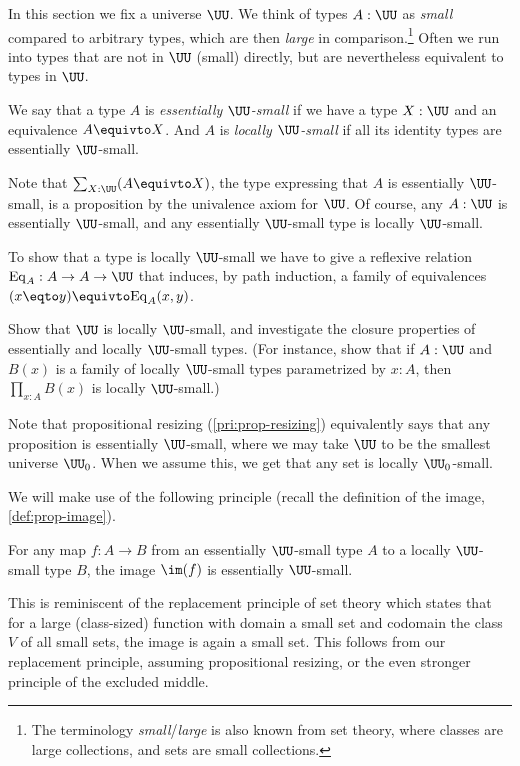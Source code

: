 In this section we fix a universe $\UU$.
We think of types $A:\UU$ as \emph{small} compared to arbitrary types,
which are then \emph{large} in comparison.\footnote{%
  The terminology \emph{small}/\emph{large} is also known from set theory,
  where classes are large collections,
  and sets are small collections.}
Often we run into types that are not in $\UU$ (small) directly,
but are nevertheless equivalent to types in $\UU$.
\begin{definition}\label{def:ess-loc-small}
  We say that a type $A$ is \emph{essentially $\UU$-small} if we
  have a type $X:\UU$ and an equivalence $A \equivto
  X$. And $A$ is \emph{locally $\UU$-small} if all its identity types
  are essentially $\UU$-small.
\end{definition}
Note that $\sum_{X:\UU}(A \equivto X)$, the type expressing that
$A$ is essentially $\UU$-small, is a proposition by the
univalence axiom for $\UU$.
Of course, any $A:\UU$ is essentially $\UU$-small,
and any essentially $\UU$-small type is locally $\UU$-small.

To show that a type is locally $\UU$-small
we have to give a reflexive relation
$\mathrm{Eq}_A : A \to A \to \UU$
that induces, by path induction, a family of equivalences
$(x \eqto y) \equivto \mathrm{Eq}_A(x,y)$.

\begin{xca}
  Show that $\UU$ is locally $\UU$-small, and investigate
  the closure properties of essentially and locally $\UU$-small types.
  (For instance, show that if $A:\UU$ and $B(x)$ is a family of locally $\UU$-small
  types parametrized by $x:A$, then $\prod_{x:A}B(x)$ is locally $\UU$-small.)
\end{xca}

\begin{remark}
  Note that propositional resizing (\cref{pri:prop-resizing})
  equivalently says that any proposition is essentially $\UU$-small,
  where we may take $\UU$ to be the smallest universe $\UU_0$.
  When we assume this, we get that any set is locally $\UU_0$-small.
\end{remark}

We will make use of the following principle
(recall the definition of the image, \cref{def:prop-image}).
\begin{principle}[Replacement]
  \label{pri:replacement}
  For any map $f : A \to B$
  from an essentially $\UU$-small type $A$
  to a locally $\UU$-small type $B$,
  the image $\im(f)$ is essentially $\UU$-small.
\end{principle}
This is reminiscent of the replacement principle of set theory which states
that for a large (class-sized) function with domain a small set
and codomain the class $V$ of all small sets,
the image is again a small set.
This follows from our replacement principle,
assuming propositional resizing,
or the even stronger principle of the excluded middle.

